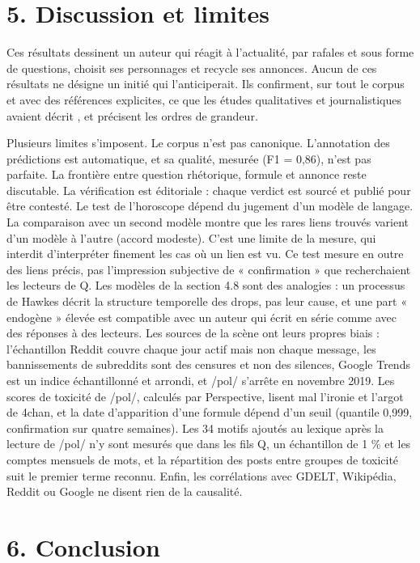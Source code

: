 \documentclass[11pt,a4paper]{article}
\begin{document}
\section*{5. Discussion et limites}

Ces résultats dessinent un auteur qui réagit à l'actualité, par rafales et sous forme de questions, choisit ses personnages et recycle ses annonces. Aucun de ces résultats ne désigne un initié qui l'anticiperait. Ils confirment, sur tout le corpus et avec des références explicites, ce que les études qualitatives et journalistiques avaient décrit \parencite{rothschild2021storm,tian2021qanon}, et précisent les ordres de grandeur.

Plusieurs limites s'imposent. Le corpus n'est pas canonique. L'annotation des prédictions est automatique, et sa qualité, mesurée (F1 = 0,86), n'est pas parfaite. La frontière entre question rhétorique, formule et annonce reste discutable. La vérification est éditoriale : chaque verdict est sourcé et publié pour être contesté. Le test de l'horoscope dépend du jugement d'un modèle de langage. La comparaison avec un second modèle montre que les rares liens trouvés varient d'un modèle à l'autre (accord modeste). C'est une limite de la mesure, qui interdit d'interpréter finement les cas où un lien est vu. Ce test mesure en outre des liens précis, pas l'impression subjective de « confirmation » que recherchaient les lecteurs de Q. Les modèles de la section 4.8 sont des analogies : un processus de Hawkes décrit la structure temporelle des drops, pas leur cause, et une part « endogène » élevée est compatible avec un auteur qui écrit en série comme avec des réponses à des lecteurs. Les sources de la scène ont leurs propres biais : l'échantillon Reddit couvre chaque jour actif mais non chaque message, les bannissements de subreddits sont des censures et non des silences, Google Trends est un indice échantillonné et arrondi, et /pol/ s'arrête en novembre 2019. Les scores de toxicité de /pol/, calculés par Perspective, lisent mal l'ironie et l'argot de 4chan, et la date d'apparition d'une formule dépend d'un seuil (quantile 0,999, confirmation sur quatre semaines). Les 34 motifs ajoutés au lexique après la lecture de /pol/ n'y sont mesurés que dans les fils Q, un échantillon de 1 \% et les comptes mensuels de mots, et la répartition des posts entre groupes de toxicité suit le premier terme reconnu. Enfin, les corrélations avec GDELT, Wikipédia, Reddit ou Google ne disent rien de la causalité.

\section*{6. Conclusion}
\end{document}

